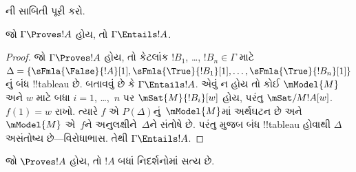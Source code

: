 \documentclass[../../../include/open-logic-section]{subfiles}
\begin{document}
\begin{prob}
ની સાબિતી પૂરી કરો.
\end{prob}

\begin{cor}
જો $\Gamma \Proves !A$ હોય, તો $\Gamma \Entails !A$.
\end{cor}

\begin{proof}
  જો $\Gamma \Proves !A$ હોય, તો કેટલાંક $!B_1$, \dots,
  $!B_n \in \Gamma$ માટે
  $\Delta = \{\sFmla{\False}{!A}[1], \sFmla{\True}{!B_1}[1],
  \dots, \sFmla{\True}{!B_n}[1]\}$નું બંધ !!{tableau} છે.
  બતાવવું છે કે $\Gamma \Entails !A$. એવું ન હોય તો કોઈ
  $\mModel{M}$ અને $w$ માટે બધા $i=1$, \dots,~$n$ પર
  $\mSat{M}{!B_i}[w]$ હોય, પરંતુ
  $\mSat/{M}{!A}[w]$. $f(1) = w$ રાખો. ત્યારે $f$ એ
  $P(\Delta)$નું~$\mModel{M}$માં અર્થઘટન છે અને
  $\mModel{M}$ એ~$f$ને અનુલક્ષીને~$\Delta$ને સંતોષે છે.
  પરંતુ  મુજબ બંધ !!{tableau}
  હોવાથી $\Delta$ અસંતોષ્ય છે—વિરોધાભાસ. તેથી
  $\Gamma \Entails !A$.
\end{proof}

\begin{cor}
જો $\Proves !A$ હોય, તો $!A$ બધાં નિદર્શનોમાં સત્ય છે.
\end{cor}
\end{document}
